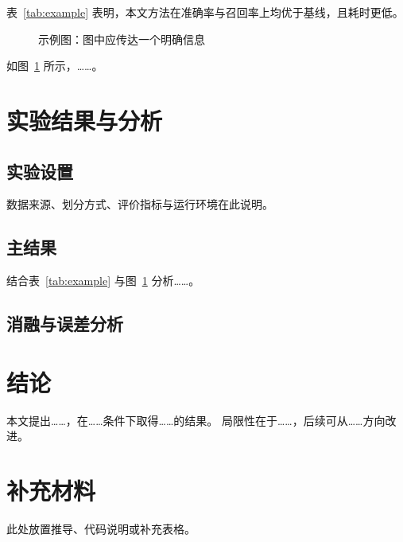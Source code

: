 \documentclass[UTF8,a4paper,zihao=-4]{ctexart}
\begin{document}
表~\ref{tab:example} 表明，本文方法在准确率与召回率上均优于基线，且耗时更低。

\begin{figure}[htbp]
  \centering
  \fbox{\rule{0pt}{4cm}\rule{8cm}{0pt}}
  \caption{示例图：图中应传达一个明确信息}
  \label{fig:example}
\end{figure}

如图~\ref{fig:example} 所示，\ldots\ldots。

\section{实验结果与分析}
\label{sec:exp}

\subsection{实验设置}

数据来源、划分方式、评价指标与运行环境在此说明。

\subsection{主结果}

结合表~\ref{tab:example} 与图~\ref{fig:example} 分析\ldots\ldots。

\subsection{消融与误差分析}

\section{结论}
\label{sec:conclusion}

本文提出\ldots\ldots，在\ldots\ldots 条件下取得\ldots\ldots 的结果。
局限性在于\ldots\ldots，后续可从\ldots\ldots 方向改进。

\printbibliography[heading=bibintoc,title={参考文献}]


\appendix
\section{补充材料}
\label{app:extra}

此处放置推导、代码说明或补充表格。
\end{document}
